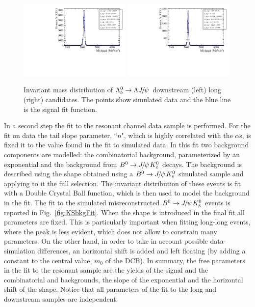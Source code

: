 \begin{figure}
\centering
\includegraphics[width=0.49\textwidth]{Lmumu/figs/MassFits/fitLb2JpsiL_DD_MC.pdf}
\includegraphics[width=0.49\textwidth]{Lmumu/figs/MassFits/fitLb2JpsiL_LL_MC.pdf}
\caption{Invariant mass distribution of $\Lb\ra\Lz\jpsi$ downstream (left) long (right) candidates.
The points show simulated data and the blue line is the signal fit function.}
\label{fig:Lb_jpsiMCfit}
\end{figure}

In a second step the fit to the resonant channel data sample is performed.
For the fit on data the tail slope parameter, ``$n$", which is highly correlated
with the $\alpha$s, is fixed it to the value found in the fit to simulated data.
In this fit two background components are modelled: the combinatorial background,
parameterized by an exponential and the background from $\Bz\ra\jpsi\KS$ decays.
The \KS background is described using the shape obtained using a $\Bz\ra\jpsi\KS$ simulated
sample and applying to it the full selection. The invariant distribution of these events
is fit with a Double Crystal Ball function, which is then used to model the \KS background
in the \Lb\to\jpsi\Lz fit. The fit to the simulated misreconstructed $\Bz\ra\jpsi\KS$ events
is reported in Fig.~\ref{fig:KSbkgFit}. When the \KS shape is introduced in the final fit all
parameters are fixed. This is particularly important when fitting long-long events, where the \KS
peak is less evident, which does not allow to constrain many parameters. On the other hand, in order
to take in account possible data-simulation differences, an horizontal shift is added and left
floating (by adding a constant to the central value, $m_0$ of the DCB).
In summary, the free parameters in the fit to the resonant \Lb\to\jpsi\Lz sample
are the yields of the signal and the combinatorial and \KS backgrounds, the slope
of the exponential and the horizontal shift of the \KS shape. Notice that all parameters
of the fit to the long and downstream samples are independent.

